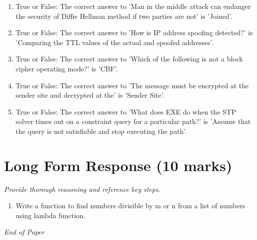 \documentclass[12pt]{article}
\begin{document}
\begin{enumerate}[label=\arabic*.]
\item True or False: The correct answer to 'Man in the middle attack can endanger the security of Diffie Hellman method if two parties are not' is 'Joined'.
\item True or False: The correct answer to 'How is IP address spoofing detected?' is 'Comparing the TTL values of the actual and spoofed addresses'.
\item True or False: The correct answer to 'Which of the following is not a block cipher operating mode?' is 'CBF'.
\item True or False: The correct answer to 'The message must be encrypted at the sender site and decrypted at the' is 'Sender Site'.
\item True or False: The correct answer to 'What does EXE do when the STP solver times out on a constraint query for a particular path?' is 'Assume that the query is not satisfiable and stop executing the path'.
\end{enumerate}

\section*{Long Form Response (10 marks)}
\textit{Provide thorough reasoning and reference key steps.}
\begin{enumerate}[label=\arabic*.]
\item Write a function to find numbers divisible by m or n from a list of numbers using lambda
function.
\end{enumerate}

\vfill
\noindent\textit{End of Paper}
\end{document}
